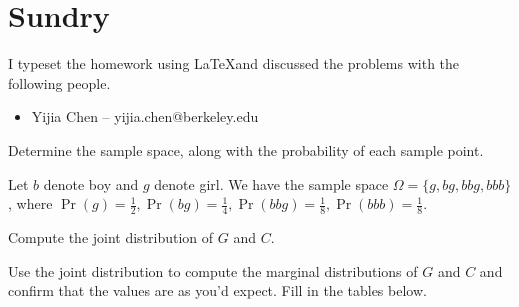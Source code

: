 \documentclass[11pt]{article}
\begin{document}
\section*{Sundry}

\begin{Answer}
    I typeset the homework using \LaTeX and discussed the problems with the following people.
    \begin{itemize}
        \item Yijia Chen -- yijia.chen@berkeley.edu
    \end{itemize}
\end{Answer}

\newpage
{}

\begin{Parts}

    \Part Determine the sample space, along with the probability of each sample point.

    \begin{Answer}
        Let $b$ denote boy and $g$ denote girl. We have the sample space $\Omega = \{g, bg, bbg, bbb\}$, 
        where $\Pr(g) = \frac{1}{2}, \Pr(bg) = \frac{1}{4}, \Pr(bbg) = \frac{1}{8}, \Pr(bbb) = \frac{1}{8}$. 
    \end{Answer}

    \Part Compute the joint distribution of $G$ and $C$.

    \begin{Answer}
    \end{Answer}

    \Part Use the joint distribution to compute the marginal distributions of $G$ and $C$ and confirm that the values are as you'd expect. Fill in the tables below.

    \begin{Answer}
    \end{Answer}


\end{Parts}
\end{document}

